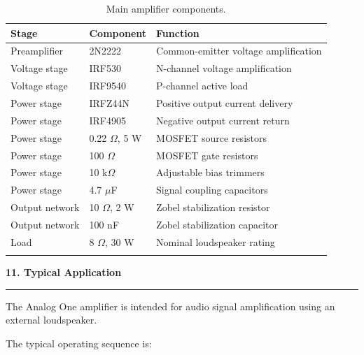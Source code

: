 \documentclass[10pt,letterpaper]{article}
\newcommand{\datasheetsection}[1]{
    \vspace{0.3cm}
    {\large\bfseries\color{datasheetblue}#1}
    \par\vspace{0.1cm}
    \hrule
    \vspace{0.15cm}
}
\begin{document}
\begin{longtable}{p{3cm}p{3.5cm}p{8cm}}

\hline
\textbf{Stage} &
\textbf{Component} &
\textbf{Function}\\
\hline

Preamplifier &
2N2222 &
Common-emitter voltage amplification\\

Voltage stage &
IRF530 &
N-channel voltage amplification\\

Voltage stage &
IRF9540 &
P-channel active load\\

Power stage &
IRFZ44N &
Positive output current delivery\\

Power stage &
IRF4905 &
Negative output current return\\

Power stage &
0.22 $\Omega$, 5 W &
MOSFET source resistors\\

Power stage &
100 $\Omega$ &
MOSFET gate resistors\\

Power stage &
10 k$\Omega$ &
Adjustable bias trimmers\\

Power stage &
4.7 $\mu$F &
Signal coupling capacitors\\

Output network &
10 $\Omega$, 2 W &
Zobel stabilization resistor\\

Output network &
100 nF &
Zobel stabilization capacitor\\

Load &
8 $\Omega$, 30 W &
Nominal loudspeaker rating\\

\hline

\caption{Main amplifier components.}

\end{longtable}

\normalsize

\datasheetsection{11. Typical Application}

The Analog One amplifier is intended
for audio signal amplification
using an external loudspeaker.

The typical operating sequence is:
\end{document}
